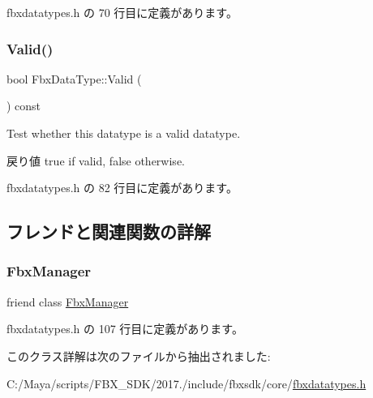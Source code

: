 fbxdatatypes.\+h の 70 行目に定義があります。

\mbox{\label{class_fbx_data_type_a3a03c1554f9a0f6f0536bbe696e4fa67}} 
\subsubsection{\texorpdfstring{Valid()}{Valid()}}
{\footnotesize\ttfamily bool Fbx\+Data\+Type\+::\+Valid (\begin{DoxyParamCaption}{ }\end{DoxyParamCaption}) const\hspace{0.3cm}{\ttfamily [inline]}}

Test whether this datatype is a valid datatype. \begin{DoxyReturn}{戻り値}
{\ttfamily true} if valid, {\ttfamily false} otherwise. 
\end{DoxyReturn}


 fbxdatatypes.\+h の 82 行目に定義があります。



\subsection{フレンドと関連関数の詳解}
\mbox{\label{class_fbx_data_type_aa6292f0d09535e3fe957088d09276268}} 
\subsubsection{\texorpdfstring{Fbx\+Manager}{FbxManager}}
{\footnotesize\ttfamily friend class \hyperlink{class_fbx_manager}{Fbx\+Manager}\hspace{0.3cm}{\ttfamily [friend]}}



 fbxdatatypes.\+h の 107 行目に定義があります。



このクラス詳解は次のファイルから抽出されました\+:\begin{DoxyCompactItemize}
\item 
C\+:/\+Maya/scripts/\+F\+B\+X\+\_\+\+S\+D\+K/2017./include/fbxsdk/core/\hyperlink{fbxdatatypes_8h}{fbxdatatypes.\+h}\end{DoxyCompactItemize}
